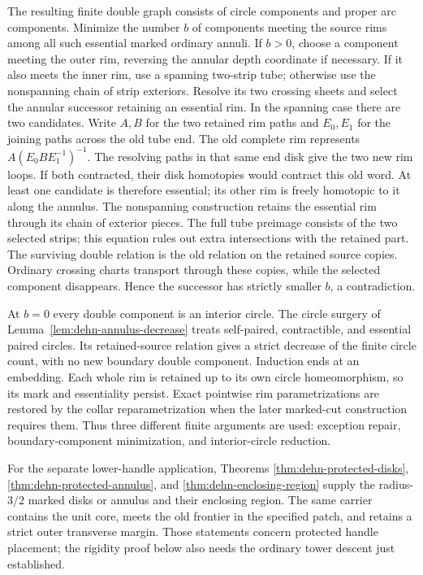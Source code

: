 The resulting finite double graph consists of circle components and
proper arc components. Minimize the number $b$ of components meeting the
source rims among all such essential marked ordinary annuli. If $b>0$,
choose a component meeting the outer rim, reversing the annular depth
coordinate if necessary. If it also meets the inner rim, use a spanning
two-strip tube; otherwise use the nonspanning chain of strip exteriors.
Resolve its two crossing sheets and select the annular successor retaining
an essential rim. In the spanning case there are two candidates. Write
$A,B$ for the two retained rim paths and $E_0,E_1$ for the joining
paths across the old tube end. The old complete rim represents
$A(E_0BE_1^{-1})^{-1}$. The resolving paths in that same end disk
give the two new rim loops. If both contracted, their disk homotopies
would contract this old word. At least one candidate is therefore
essential; its other rim is freely homotopic to it along the annulus.
The nonspanning construction retains the essential rim through its
chain of exterior pieces.
The full tube preimage consists of the two selected strips; this equation
rules out extra intersections with the retained part. The surviving double
relation is the old relation on the retained source copies. Ordinary
crossing charts transport through these copies, while the selected
component disappears. Hence the successor has strictly smaller $b$, a
contradiction.

At $b=0$ every double component is an interior circle. The circle surgery
of Lemma~\ref{lem:dehn-annulus-decrease} treats self-paired, contractible,
and essential paired circles. Its retained-source relation gives a
strict decrease of the finite circle count, with no new boundary double
component. Induction ends at an embedding. Each whole rim is retained
up to its own circle homeomorphism, so its mark and essentiality persist.
Exact pointwise rim parametrizations are restored by the collar
reparametrization when the later marked-cut construction requires them.
Thus three different finite arguments are used: exception repair,
boundary-component minimization, and interior-circle reduction.

For the separate lower-handle application, Theorems
\ref{thm:dehn-protected-disks}, \ref{thm:dehn-protected-annulus}, and
\ref{thm:dehn-enclosing-region} supply the radius-$3/2$ marked disks or
annulus and their enclosing region. The same carrier contains the unit
core, meets the old frontier in the specified patch, and retains a strict
outer transverse margin. Those statements concern protected handle
placement; the rigidity proof below also needs the ordinary tower descent
just established.

